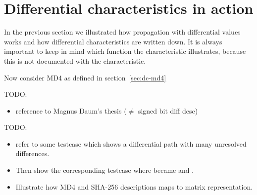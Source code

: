 \section{Differential characteristics in action}
\label{sec:dc-actual-chars}
%
In the previous section we illustrated how propagation with differential values
works and how differential characteristics are written down. It is always
important to keep in mind which function the characteristic illustrates,
because this is not documented with the characteristic.

Now consider MD4 as defined in section~\ref{sec:dc-md4}


TODO:
\begin{itemize}
  \item reference to Magnus Daum's thesis ($\neq$ signed bit diff desc)
\end{itemize}

TODO:
\begin{itemize}
  \item refer to some testcase which shows a differential path with many unresolved differences.
  \item Then show the corresponding testcase where  became \dnI{-} and .
  \item Illustrate how MD4 and SHA-256 descriptions maps to matrix representation.
\end{itemize}
